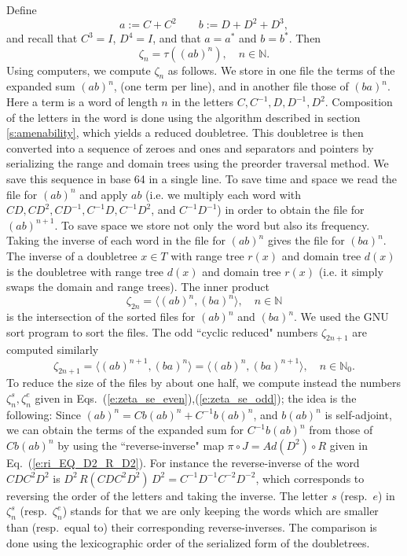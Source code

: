 \documentclass{amsart}
\newcommand{\N}{\mathbb N}
\theoremstyle{definition}
\begin{document}
Define
$$a:=C+C^2\qquad b:=D+D^2+D^3,$$
and recall that $C^3=I$, $D^4=I$, and that $a=a^*$ and $b=b^*$. Then
$$\zeta_n=\tau((ab)^n),\quad n\in\N.$$
Using computers, we compute $\zeta_n$  as follows.
We store in one file the terms of the expanded sum $(ab)^n$, (one term per line), and in another file those of $(ba)^n$. Here a term is a word of length $n$  in the letters $C,C^{-1}, D,D^{-1},D^2$.
Composition of the letters in the word is done using the algorithm described in section \ref{s:amenability}, which yields a reduced doubletree. This doubletree is then converted into a sequence of zeroes and ones and separators and pointers by serializing the range and domain trees  using the preorder traversal method. We save this sequence in base 64 in a single line.
To save time and space we read the file for $(ab)^n$ and apply $ab$ (i.e. we multiply each word with 
$CD,CD^2,CD^{-1},C^{-1}D,C^{-1}D^2$, and $C^{-1}D^{-1}$) in order to obtain the file for
$(ab)^{n+1}$. To save space we store not only the word but also its frequency.
Taking the inverse of each word  in the file for $(ab)^n$ gives the file for $(ba)^n$.
The inverse of a doubletree $x\in T$ with range tree $r(x)$ and domain tree $d(x)$ is the doubletree with range tree $d(x)$ and domain tree $r(x)$ (i.e. it simply swaps the domain and range trees).
The inner product
$$\zeta_{2n}=\langle (ab)^n, (ba)^n\rangle, \quad n\in\N$$
is the intersection of the sorted files for $(ab)^n$ and $(ba)^n$. We used the GNU sort program to sort the files.
The odd ``cyclic reduced" numbers $\zeta_{2n+1}$ are computed similarly
$$\zeta_{2n+1}=\langle (ab)^{n+1}, (ba)^n\rangle=\langle (ab)^{n}, (ba)^{n+1}\rangle,\quad n\in\N_0.$$
To reduce the size of the files by about one half, we compute instead the numbers
$\zeta_{n}^s, \zeta_{n}^e$ given in Eqs.~(\ref{e:zeta_se_even}),(\ref{e:zeta_se_odd});
the idea is the following: Since $(ab)^n=Cb(ab)^n+C^{-1}b(ab)^n$, and $b(ab)^n$ is self-adjoint, we can obtain the terms of the expanded sum for  $C^{-1}b(ab)^n$ from those of $Cb(ab)^n$ by using the ``reverse-inverse" map $\pi\circ J=Ad(D^2)\circ R$ given in  Eq.~(\ref{e:ri_EQ_D2_R_D2}). For instance the reverse-inverse of the word $CDC^2D^2$ is $D^2\,R(CDC^2D^2)\,D^2=C^{-1}D^{-1}C^{-2}D^{-2}$, which corresponds to reversing the order of the letters and taking the inverse. The letter $s$ (resp.~$e$) in $\zeta_{n}^s$ (resp.~$\zeta_{n}^e$) stands for that we are only keeping the words which are smaller than (resp.~equal to) their corresponding reverse-inverses.
The comparison is done using the lexicographic order of the serialized form of the doubletrees.
\end{document}
